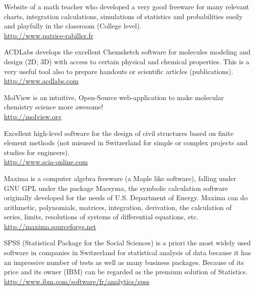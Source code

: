 	{\Large {}}{\Large {}}{\Large {}}\bcdfrance{} Website of a math teacher who developed a very good freeware for many relevant charts, integration calculations, simulations of statistics and probabilities easily and playfully in the classroom (College level).\\
	\href{http://www.patrice-rabiller.fr}{\color{blue}http://www.patrice-rabiller.fr}
	
	{\Large {}}{\Large {}} ACDLabs develops the excellent Chemsketch software for molecules modeling and design (2D, 3D) with access to certain physical and chemical properties. This is a very useful tool also to prepare handouts or scientific articles (publications).\\
	\href{http://www.acdlabs.com}{\color{blue}http://www.acdlabs.com}
	
	{\Large {}}{\Large {}}{\Large {}} MolView is an intuitive, Open-Source web-application to make molecular chemistry science more awesome!\\
	\href{http://molview.org}{\color{blue}http://molview.org}
	
	{\Large {}}{\Large {}} Excellent high-level software for the design of civil structures based on finite element methods (not misused in Switzerland for simple or complex projects and studies for engineers).\\
	\href{http://www.scia-online.com}{\color{blue}http://www.scia-online.com}
	
	{\Large {}}{\Large {}} Maxima is a computer algebra freeware (a Maple like software), falling under GNU GPL under the package Macsyma, the symbolic calculation software originally developed for the needs of U.S. Department of Energy. Maxima can do arithmetic, polynomials, matrices, integration, derivation, the calculation of series, limits, resolutions of systems of differential equations, etc.\\
	\href{http://maxima.sourceforge.net}{\color{blue}http://maxima.sourceforge.net}
	
	{\Large {}}{\Large {}} SPSS (Statistical Package for the Social Sciences) is a priori the most widely used software in companies in Switzerland for statistical analysis of data because it has an impressive number of tests as well as many business packages. Because of its price and its owner (IBM) can be regarded as the premium solution of Statistics.\\
	\href{http://www.ibm.com/software/fr/analytics/spss}{\color{blue}http://www.ibm.com/software/fr/analytics/spss}
	
